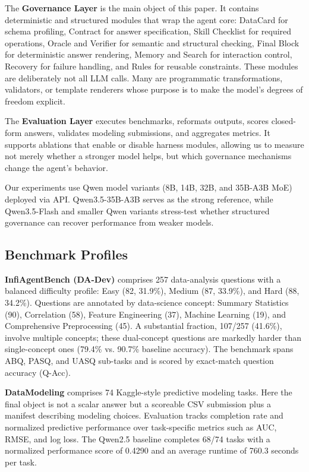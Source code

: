 \documentclass[letterpaper]{article} %
\begin{document}
The \textbf{Governance Layer} is the main object of this paper.  It contains deterministic and structured modules that wrap the agent core: DataCard for schema profiling, Contract for answer specification, Skill Checklist for required operations, Oracle and Verifier for semantic and structural checking, Final Block for deterministic answer rendering, Memory and Search for interaction control, Recovery for failure handling, and Rules for reusable constraints.  These modules are deliberately not all LLM calls.  Many are programmatic transformations, validators, or template renderers whose purpose is to make the model's degrees of freedom explicit.

The \textbf{Evaluation Layer} executes benchmarks, reformats outputs, scores closed-form answers, validates modeling submissions, and aggregates metrics.  It supports ablations that enable or disable harness modules, allowing us to measure not merely whether a stronger model helps, but which governance mechanisms change the agent's behavior.

Our experiments use Qwen model variants (8B, 14B, 32B, and 35B-A3B MoE) deployed via API.  Qwen3.5-35B-A3B serves as the strong reference, while Qwen3.5-Flash and smaller Qwen variants stress-test whether structured governance can recover performance from weaker models.

\subsection{Benchmark Profiles}

\textbf{InfiAgentBench (DA-Dev)} comprises 257 data-analysis questions with a balanced difficulty profile: Easy (82, 31.9\%), Medium (87, 33.9\%), and Hard (88, 34.2\%).  Questions are annotated by data-science concept: Summary Statistics (90), Correlation (58), Feature Engineering (37), Machine Learning (19), and Comprehensive Preprocessing (45).  A substantial fraction, 107/257 (41.6\%), involve multiple concepts; these dual-concept questions are markedly harder than single-concept ones (79.4\% vs. 90.7\% baseline accuracy).  The benchmark spans ABQ, PASQ, and UASQ sub-tasks and is scored by exact-match question accuracy (Q-Acc).

\textbf{DataModeling} comprises 74 Kaggle-style predictive modeling tasks.  Here the final object is not a scalar answer but a scoreable CSV submission plus a manifest describing modeling choices.  Evaluation tracks completion rate and normalized predictive performance over task-specific metrics such as AUC, RMSE, and log loss.  The Qwen2.5 baseline completes 68/74 tasks with a normalized performance score of 0.4290 and an average runtime of 760.3 seconds per task.
\end{document}
